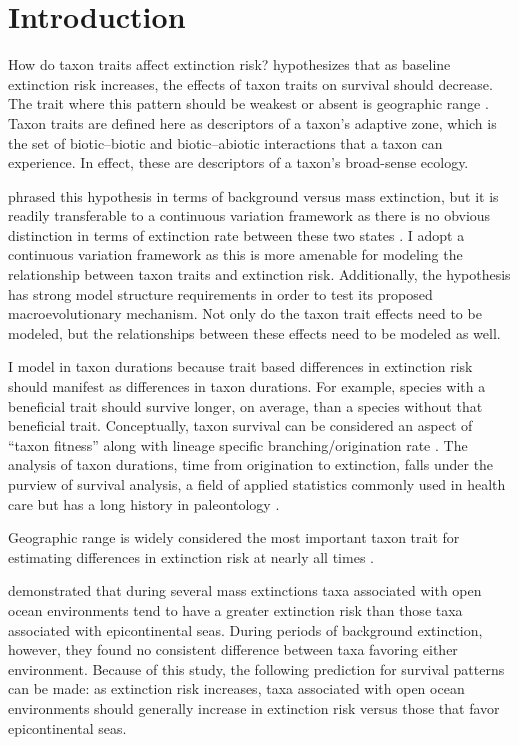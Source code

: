 \documentclass[12pt,letterpaper]{article}
\begin{document}
\section{Introduction}

How do taxon traits affect extinction risk? \citet{Jablonski1986} hypothesizes that as baseline extinction risk increases, the effects of taxon traits on survival should decrease. The trait where this pattern should be weakest or absent is geographic range \citep{Jablonski1986}. Taxon traits are defined here as descriptors of a taxon's adaptive zone, which is the set of biotic--biotic and biotic--abiotic interactions that a taxon can experience. In effect, these are descriptors of a taxon's broad-sense ecology.

\citet{Jablonski1986} phrased this hypothesis in terms of background versus mass extinction, but it is readily transferable to a continuous variation framework as there is no obvious distinction in terms of extinction rate between these two states \citep{Wang2003}. I adopt a continuous variation framework as this is more amenable for modeling the relationship between taxon traits and extinction risk. Additionally, the \citet{Jablonski1986} hypothesis has strong model structure requirements in order to test its proposed macroevolutionary mechanism. Not only do the taxon trait effects need to be modeled, but the relationships between these effects need to be modeled as well. 

I model in taxon durations because trait based differences in extinction risk should manifest as differences in taxon durations. For example, species with a beneficial trait should survive longer, on average, than a species without that beneficial trait. Conceptually, taxon survival can be considered an aspect of ``taxon fitness'' along with lineage specific branching/origination rate \citep{Cooper1984,Palmer2012}. The analysis of taxon durations, time from origination to extinction, falls under the purview of survival analysis, a field of applied statistics commonly used in health care \citep{Klein2003} but has a long history in paleontology \citep{Simpson1944,Simpson1953,VanValen1973,VanValen1979}.

Geographic range is widely considered the most important taxon trait for estimating differences in extinction risk at nearly all times \citep{Jablonski1986,Jablonski1987,Jablonski2003,Payne2007}. 

\citet{Miller2009a} demonstrated that during several mass extinctions taxa associated with open ocean environments tend to have a greater extinction risk than those taxa associated with epicontinental seas. During periods of background extinction, however, they found no consistent difference between taxa favoring either environment. Because of this study, the following prediction for survival patterns can be made: as extinction risk increases, taxa associated with open ocean environments should generally increase in extinction risk versus those that favor epicontinental seas.
\end{document}
